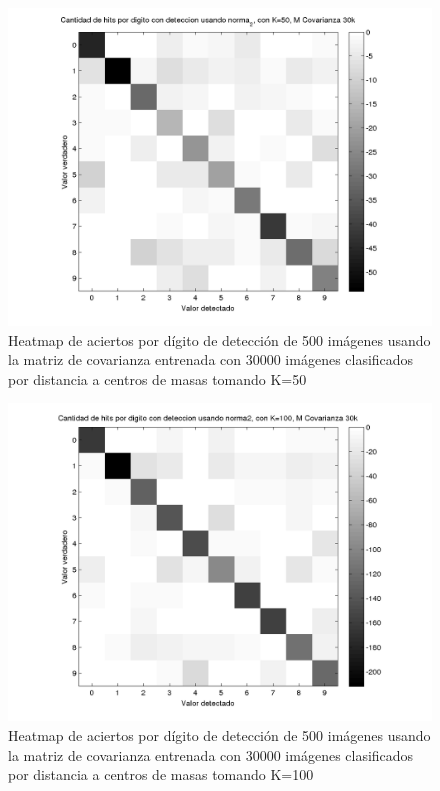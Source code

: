\begin{figure}[H]
\includegraphics[width=\hmwidth]{plots/heatmap-30kcv-k50-norma_2.png}
\caption{Heatmap de aciertos por d\'igito de detecci\'on de 500 im\'agenes usando la matriz de covarianza entrenada con 30000 im\'agenes
clasificados por distancia a centros de masas tomando K=50 }
\label{fig:HM30kcv-k50}
\end{figure}

\begin{figure}[H]
\includegraphics[width=\hmwidth]{plots/heatmap-30kcv-k100-norma_2.png}
\caption{Heatmap de aciertos por d\'igito de detecci\'on de 500 im\'agenes usando la matriz de covarianza entrenada con 30000 im\'agenes
clasificados por distancia a centros de masas tomando K=100 }
\label{fig:HM30kcv-k100}
\end{figure}
